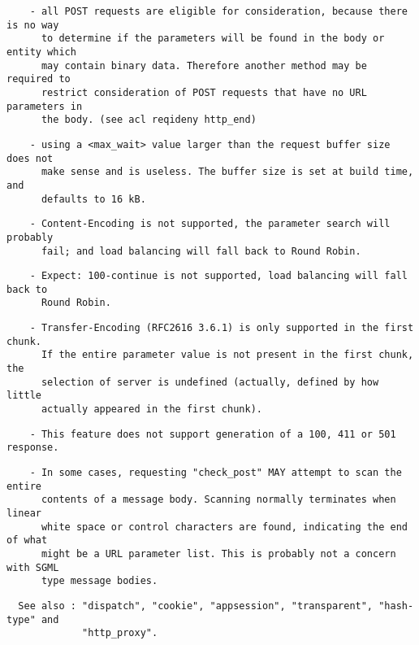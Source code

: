 \begin{verbatim}
    - all POST requests are eligible for consideration, because there is no way
      to determine if the parameters will be found in the body or entity which
      may contain binary data. Therefore another method may be required to
      restrict consideration of POST requests that have no URL parameters in
      the body. (see acl reqideny http_end)
\end{verbatim}

\begin{verbatim}
    - using a <max_wait> value larger than the request buffer size does not
      make sense and is useless. The buffer size is set at build time, and
      defaults to 16 kB.
\end{verbatim}

\begin{verbatim}
    - Content-Encoding is not supported, the parameter search will probably
      fail; and load balancing will fall back to Round Robin.
\end{verbatim}

\begin{verbatim}
    - Expect: 100-continue is not supported, load balancing will fall back to
      Round Robin.
\end{verbatim}

\begin{verbatim}
    - Transfer-Encoding (RFC2616 3.6.1) is only supported in the first chunk.
      If the entire parameter value is not present in the first chunk, the
      selection of server is undefined (actually, defined by how little
      actually appeared in the first chunk).
\end{verbatim}

\begin{verbatim}
    - This feature does not support generation of a 100, 411 or 501 response.
\end{verbatim}

\begin{verbatim}
    - In some cases, requesting "check_post" MAY attempt to scan the entire
      contents of a message body. Scanning normally terminates when linear
      white space or control characters are found, indicating the end of what
      might be a URL parameter list. This is probably not a concern with SGML
      type message bodies.
\end{verbatim}

\begin{verbatim}
  See also : "dispatch", "cookie", "appsession", "transparent", "hash-type" and
             "http_proxy".
\end{verbatim}

